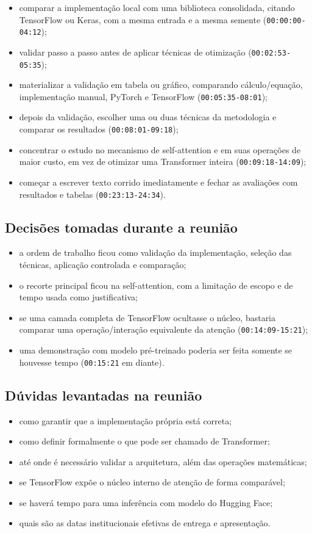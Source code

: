 \begin{itemize}
\item comparar a implementação local com uma biblioteca consolidada, citando
TensorFlow ou Keras, com a mesma entrada e a mesma semente (\texttt{00:00:00-04:12});
\item validar passo a passo antes de aplicar técnicas de otimização (\texttt{00:02:53-05:35});
\item materializar a validação em tabela ou gráfico, comparando cálculo/equação,
implementação manual, PyTorch e TensorFlow (\texttt{00:05:35-08:01});
\item depois da validação, escolher uma ou duas técnicas da metodologia e comparar
os resultados (\texttt{00:08:01-09:18});
\item concentrar o estudo no mecanismo de self-attention e em suas operações de
maior custo, em vez de otimizar uma Transformer inteira (\texttt{00:09:18-14:09});
\item começar a escrever texto corrido imediatamente e fechar as avaliações com
resultados e tabelas (\texttt{00:23:13-24:34}).
\end{itemize}


\subsection{Decisões tomadas durante a reunião}


\begin{itemize}
\item a ordem de trabalho ficou como validação da implementação, seleção das
técnicas, aplicação controlada e comparação;
\item o recorte principal ficou na self-attention, com a limitação de escopo e de
tempo usada como justificativa;
\item se uma camada completa de TensorFlow ocultasse o núcleo, bastaria comparar
uma operação/interação equivalente da atenção (\texttt{00:14:09-15:21});
\item uma demonstração com modelo pré-treinado poderia ser feita somente se
houvesse tempo (\texttt{00:15:21} em diante).
\end{itemize}


\subsection{Dúvidas levantadas na reunião}


\begin{itemize}
\item como garantir que a implementação própria está correta;
\item como definir formalmente o que pode ser chamado de Transformer;
\item até onde é necessário validar a arquitetura, além das operações matemáticas;
\item se TensorFlow expõe o núcleo interno de atenção de forma comparável;
\item se haverá tempo para uma inferência com modelo do Hugging Face;
\item quais são as datas institucionais efetivas de entrega e apresentação.
\end{itemize}


